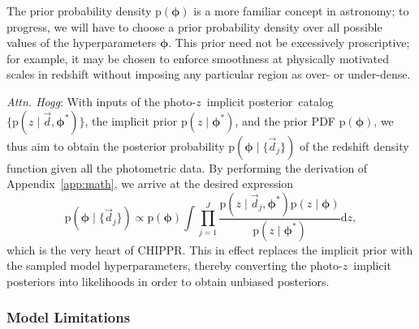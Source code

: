 \documentclass[iop]{emulateapj}
\newcommand{\todo}[3]{{\color{#2}\emph{#1}: #3}}
\newcommand{\dwh}[1]{\todo{Attn. Hogg}{blue}{#1}}
\newcommand{\project}[1]{\textsc{#1}}
\newcommand{\Chippr}{\project{CHIPPR}}%
\newcommand{\data}{\ensuremath{\vec{d}}}%
\newcommand{\pr}[1]{\ensuremath{\mathrm{p}(#1)}}%
\newcommand{\gvn}{\mid}%
\newcommand{\integral}[2]{\ensuremath{\int #1 \mathrm{d} #2}}
\newcommand{\pz}{photo-$z$}
\newcommand{\pzip}{\pz\ implicit posterior}
\newcommand{\bvec}[1]{\ensuremath{\boldsymbol{#1}}}%
\newcommand{\ndphi}{\bvec{\phi}}
\begin{document}

The prior probability density $\pr{\ndphi}$ is a more familiar concept in astronomy; to progress, we will have to choose a prior probability density over all possible values of the hyperparameters $\ndphi$.
This prior need not be excessively proscriptive; for example, it may be chosen to enforce smoothness at physically motivated scales in redshift without imposing any particular region as over- or under-dense.

\dwh{With inputs of the \pzip\ catalog $\{\pr{z \gvn \data, \ndphi^{*}}\}$, the implicit prior $\pr{z \gvn \ndphi^{*}}$, and the prior PDF $\pr{\ndphi}$, we thus aim to obtain the posterior probability $\pr{\ndphi \gvn \{\data_{j}\}}$ of the redshift density function given all the photometric data.
By performing the derivation of Appendix~\ref{app:math}, we arrive at the desired expression
\begin{equation}
\label{eqn:fullpost}
\pr{\ndphi \gvn \{\data_{j}\}} \propto \pr{\ndphi} \integral{\prod_{j=1}^{J} \frac{\pr{z \gvn \data_{j}, \ndphi^{*}} \pr{z \gvn \ndphi}}{\pr{z \gvn \ndphi^{*}}}}{z},
\end{equation}
which is the very heart of \Chippr.
This in effect replaces the implicit prior with the sampled model hyperparameters, thereby converting the \pzip s into likelihoods in order to obtain unbiased posteriors.}

\subsubsection{Model Limitations}
\label{sec:limitations}
\end{document}
